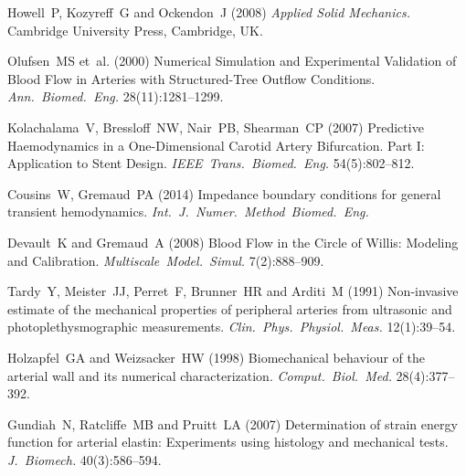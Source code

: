 \documentclass{frontiers_suppmat} %
\begin{document}
\begin{thebibliography}{10}
Howell~P, Kozyreff~G and Ockendon~J (2008) {\em Applied Solid Mechanics.} Cambridge University Press, Cambridge, UK.

Olufsen~MS et~al. (2000) Numerical Simulation and Experimental Validation of Blood Flow in Arteries with Structured-Tree Outflow Conditions. {\em Ann.~Biomed.~Eng.} 28(11):1281--1299.

Kolachalama~V, Bressloff~NW, Nair~PB, Shearman~CP (2007) Predictive Haemodynamics in a One-Dimensional Carotid Artery Bifurcation. Part I: Application to Stent Design. {\em IEEE~Trans.~Biomed.~Eng.} 54(5):802--812.

Cousins~W, Gremaud~PA (2014) Impedance boundary conditions for general transient hemodynamics. {\em Int.~J.~Numer.~Method~Biomed.~Eng.}

Devault~K and Gremaud~A (2008) Blood Flow in the Circle of Willis: Modeling and Calibration. {\em Multiscale~Model.~Simul.} 7(2):888--909.

Tardy~Y, Meister~JJ, Perret~F, Brunner~HR and Arditi~M (1991) Non-invasive estimate of the mechanical properties of peripheral arteries from ultrasonic and photoplethysmographic measurements. {\em Clin.~Phys.~Physiol.~Meas.} 12(1):39--54.

Holzapfel~GA and Weizsacker~HW (1998) Biomechanical behaviour of the arterial wall and its numerical characterization. {\em Comput.~Biol.~Med.} 28(4):377--392.

Gundiah~N, Ratcliffe~MB and Pruitt~LA (2007) Determination of strain energy function for arterial elastin: Experiments using histology and mechanical tests. {\em J.~Biomech.} 40(3):586--594.  
\end{thebibliography}
\end{document}
